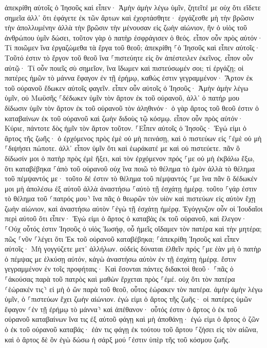 \documentclass[twoside, 9pt]{extreport}
\begin{document}
ἀπεκρίθη αὐτοῖς ὁ Ἰησοῦς καὶ εἶπεν· Ἀμὴν ἀμὴν λέγω ὑμῖν, ζητεῖτέ με οὐχ ὅτι εἴδετε σημεῖα ἀλλ᾽ ὅτι ἐφάγετε ἐκ τῶν ἄρτων καὶ ἐχορτάσθητε· 
ἐργάζεσθε μὴ τὴν βρῶσιν τὴν ἀπολλυμένην ἀλλὰ τὴν βρῶσιν τὴν μένουσαν εἰς ζωὴν αἰώνιον, ἣν ὁ υἱὸς τοῦ ἀνθρώπου ὑμῖν δώσει, τοῦτον γὰρ ὁ πατὴρ ἐσφράγισεν ὁ θεός. 
εἶπον οὖν πρὸς αὐτόν· Τί ποιῶμεν ἵνα ἐργαζώμεθα τὰ ἔργα τοῦ θεοῦ; 
ἀπεκρίθη ⸀ὁ Ἰησοῦς καὶ εἶπεν αὐτοῖς· Τοῦτό ἐστιν τὸ ἔργον τοῦ θεοῦ ἵνα ⸀πιστεύητε εἰς ὃν ἀπέστειλεν ἐκεῖνος. 
εἶπον οὖν αὐτῷ· Τί οὖν ποιεῖς σὺ σημεῖον, ἵνα ἴδωμεν καὶ πιστεύσωμέν σοι; τί ἐργάζῃ; 
οἱ πατέρες ἡμῶν τὸ μάννα ἔφαγον ἐν τῇ ἐρήμῳ, καθώς ἐστιν γεγραμμένον· Ἄρτον ἐκ τοῦ οὐρανοῦ ἔδωκεν αὐτοῖς φαγεῖν. 
εἶπεν οὖν αὐτοῖς ὁ Ἰησοῦς· Ἀμὴν ἀμὴν λέγω ὑμῖν, οὐ Μωϋσῆς ⸀δέδωκεν ὑμῖν τὸν ἄρτον ἐκ τοῦ οὐρανοῦ, ἀλλ᾽ ὁ πατήρ μου δίδωσιν ὑμῖν τὸν ἄρτον ἐκ τοῦ οὐρανοῦ τὸν ἀληθινόν· 
ὁ γὰρ ἄρτος τοῦ θεοῦ ἐστιν ὁ καταβαίνων ἐκ τοῦ οὐρανοῦ καὶ ζωὴν διδοὺς τῷ κόσμῳ. 
εἶπον οὖν πρὸς αὐτόν· Κύριε, πάντοτε δὸς ἡμῖν τὸν ἄρτον τοῦτον. 
⸀Εἶπεν αὐτοῖς ὁ Ἰησοῦς· Ἐγώ εἰμι ὁ ἄρτος τῆς ζωῆς· ὁ ἐρχόμενος πρὸς ἐμὲ οὐ μὴ πεινάσῃ, καὶ ὁ πιστεύων εἰς ⸀ἐμὲ οὐ μὴ ⸀διψήσει πώποτε. 
ἀλλ᾽ εἶπον ὑμῖν ὅτι καὶ ἑωράκατέ με καὶ οὐ πιστεύετε. 
πᾶν ὃ δίδωσίν μοι ὁ πατὴρ πρὸς ἐμὲ ἥξει, καὶ τὸν ἐρχόμενον πρός ⸀με οὐ μὴ ἐκβάλω ἔξω, 
ὅτι καταβέβηκα ⸀ἀπὸ τοῦ οὐρανοῦ οὐχ ἵνα ποιῶ τὸ θέλημα τὸ ἐμὸν ἀλλὰ τὸ θέλημα τοῦ πέμψαντός με· 
τοῦτο δέ ἐστιν τὸ θέλημα τοῦ πέμψαντός ⸀με ἵνα πᾶν ὃ δέδωκέν μοι μὴ ἀπολέσω ἐξ αὐτοῦ ἀλλὰ ἀναστήσω ⸀αὐτὸ τῇ ἐσχάτῃ ἡμέρᾳ. 
τοῦτο ⸀γάρ ἐστιν τὸ θέλημα τοῦ ⸂πατρός μου⸃ ἵνα πᾶς ὁ θεωρῶν τὸν υἱὸν καὶ πιστεύων εἰς αὐτὸν ἔχῃ ζωὴν αἰώνιον, καὶ ἀναστήσω αὐτὸν ⸀ἐγὼ τῇ ἐσχάτῃ ἡμέρᾳ. 
Ἐγόγγυζον οὖν οἱ Ἰουδαῖοι περὶ αὐτοῦ ὅτι εἶπεν· Ἐγώ εἰμι ὁ ἄρτος ὁ καταβὰς ἐκ τοῦ οὐρανοῦ, 
καὶ ἔλεγον· ⸀Οὐχ οὗτός ἐστιν Ἰησοῦς ὁ υἱὸς Ἰωσήφ, οὗ ἡμεῖς οἴδαμεν τὸν πατέρα καὶ τὴν μητέρα; πῶς ⸀νῦν ⸀λέγει ὅτι Ἐκ τοῦ οὐρανοῦ καταβέβηκα; 
⸀ἀπεκρίθη Ἰησοῦς καὶ εἶπεν αὐτοῖς· Μὴ γογγύζετε μετ᾽ ἀλλήλων. 
οὐδεὶς δύναται ἐλθεῖν πρός ⸀με ἐὰν μὴ ὁ πατὴρ ὁ πέμψας με ἑλκύσῃ αὐτόν, κἀγὼ ἀναστήσω αὐτὸν ἐν τῇ ἐσχάτῃ ἡμέρᾳ. 
ἔστιν γεγραμμένον ἐν τοῖς προφήταις· Καὶ ἔσονται πάντες διδακτοὶ θεοῦ· ⸀πᾶς ὁ ⸀ἀκούσας παρὰ τοῦ πατρὸς καὶ μαθὼν ἔρχεται πρὸς ⸀ἐμέ. 
οὐχ ὅτι τὸν πατέρα ⸂ἑώρακέν τις⸃ εἰ μὴ ὁ ὢν παρὰ τοῦ θεοῦ, οὗτος ἑώρακεν τὸν πατέρα. 
ἀμὴν ἀμὴν λέγω ὑμῖν, ὁ ⸀πιστεύων ἔχει ζωὴν αἰώνιον. 
ἐγώ εἰμι ὁ ἄρτος τῆς ζωῆς· 
οἱ πατέρες ὑμῶν ἔφαγον ⸂ἐν τῇ ἐρήμῳ τὸ μάννα⸃ καὶ ἀπέθανον· 
οὗτός ἐστιν ὁ ἄρτος ὁ ἐκ τοῦ οὐρανοῦ καταβαίνων ἵνα τις ἐξ αὐτοῦ φάγῃ καὶ μὴ ἀποθάνῃ· 
ἐγώ εἰμι ὁ ἄρτος ὁ ζῶν ὁ ἐκ τοῦ οὐρανοῦ καταβάς· ἐάν τις φάγῃ ἐκ τούτου τοῦ ἄρτου ⸀ζήσει εἰς τὸν αἰῶνα, καὶ ὁ ἄρτος δὲ ὃν ἐγὼ δώσω ἡ σάρξ μού ⸀ἐστιν ὑπὲρ τῆς τοῦ κόσμου ζωῆς. 
\end{document}
